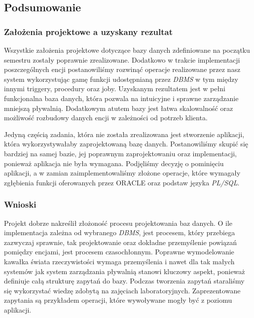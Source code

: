 \documentclass[a4paper]{article}
\begin{document}
\newpage

\subsection{Podsumowanie}

\subsubsection{Założenia projektowe a uzyskany rezultat}

Wszystkie założenia projektowe dotyczące bazy danych zdefiniowane na początku semestru zostały poprawnie zrealizowane. Dodatkowo w trakcie implementacji poszczególnych encji postanowiliśmy rozwinąć operacje realizowane przez nasz system wykorzystując gamę funkcji udostępnianą przez\textit{ DBMS} w tym między innymi triggery, procedury oraz joby. Uzyskanym rezultatem jest w pełni funkcjonalna baza danych, która pozwala na intuicyjne i sprawne zarządzanie mniejszą pływalnią. Dodatkowym atutem bazy jest łatwa skalowalność oraz możliwość rozbudowy danych encji w zależności od potrzeb klienta.

Jedyną częścią zadania, która nie została zrealizowana jest stworzenie aplikacji, która wykorzystywałaby zaprojektowaną bazę danych. Postanowiliśmy skupić się bardziej na samej bazie, jej poprawnym zaprojektowaniu oraz implementacji, ponieważ aplikacja nie była wymagana. Podjęliśmy decyzję o pominięciu aplikacji, a w zamian zaimplementowaliśmy złożone operacje, które wymagały zgłębienia funkcji oferowanych przez ORACLE oraz podstaw języka \textit{PL/SQL}.

\subsubsection{Wnioski}

Projekt dobrze nakreślił złożoność procesu projektowania baz danych. O ile implementacja zależna od wybranego \textit{DBMS}, jest procesem, który przebiega zazwyczaj sprawnie, tak projektowanie oraz dokładne przemyślenie powiązań pomiędzy encjami, jest procesem czasochłonnym. Poprawne wymodelowanie kawałka świata rzeczywistości wymaga przemyślenia i nawet dla tak małych systemów jak system zarządzania pływalnią stanowi kluczowy aspekt, ponieważ definiuje całą strukturę zapytań do bazy. Podczas tworzenia zapytań staraliśmy się wykorzystać wiedzę zdobytą na zajęciach laboratoryjnych. Zaprezentowane zapytania są przykładem operacji, które wywoływane mogły być z poziomu aplikacji.
\end{document}
